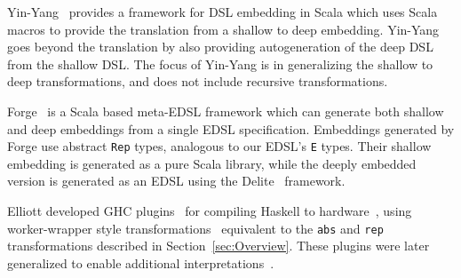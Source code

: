 \documentclass[runningheads, a4paper]{llncs}
\begin{document}
Yin-Yang~\cite{Jovanovic:2014} provides a framework for DSL
embedding in Scala which uses Scala macros to provide the 
translation from a shallow to deep embedding.  Yin-Yang
goes beyond the translation by also providing autogeneration
of the deep DSL from the shallow DSL.  The focus of
Yin-Yang is in generalizing the shallow to deep transformations,
and does not include recursive transformations.

Forge~\cite{Sujeeth:2013} is a Scala based meta-EDSL framework
which can generate both shallow and deep embeddings from
a single EDSL specification.  Embeddings generated by Forge
use abstract \verb|Rep| types, analogous to our EDSL's 
\verb|E| types.  Their shallow embedding is generated
as a pure Scala library, while the deeply embedded version
is generated as an EDSL using the Delite~\cite{Sujeeth:2014}
framework.

Elliott developed GHC plugins~\cite{github:lambda-ccc}\cite{github:reification-rules}
for compiling Haskell to hardware~\cite{github:Elliott:Talk:2015},
using worker-wrapper style transformations~\cite{Gill:09:WW}
equivalent to the \verb|abs| and
\verb|rep| transformations described in Section~\ref{sec:Overview}. These plugins were later generalized to enable additional interpretations~\cite{Elliott:2017}.





\appendix
\end{document}
